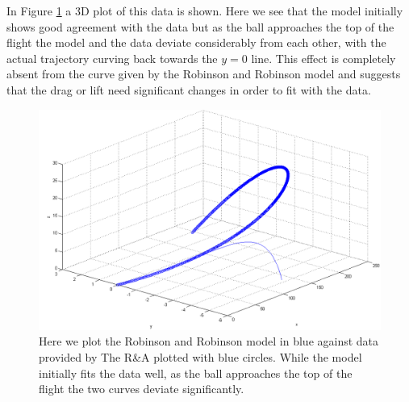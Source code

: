 In Figure \ref{data-rr-3d} a 3D plot of this data is shown. Here we see that the model initially shows
good agreement with the data but as the ball approaches the top of the flight the model and the data
deviate considerably from each other, with the actual trajectory curving back towards the $y=0$ line.
This effect is completely absent from the curve given by the Robinson and Robinson model and suggests
that the drag or lift need significant changes in order to fit with the data.

\begin{figure}
\centering
\includegraphics[scale=0.5]{../images/data1-rr-3d.png}
\caption[Plotting the data against an example Robinson and Robinson trajectory in 3D]{Here we plot the Robinson
and Robinson model in blue against data provided by The R\&A plotted with blue circles. While the model initially fits
the data well, as the ball approaches the top of the flight the two curves deviate significantly.}
\label{data-rr-3d}
\end{figure}

